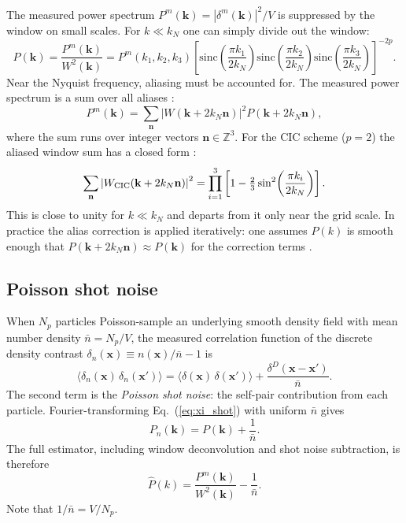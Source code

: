 \documentclass[12pt]{article}
\newcommand{\bx}{\mathbf{x}}
\newcommand{\bk}{\mathbf{k}}
\begin{document}
The measured power spectrum $P^m(\bk) = |\delta^m(\bk)|^2/V$
is suppressed by the window on small scales.  For $k \ll k_N$ one
can simply divide out the window:
%
\begin{equation}
  P(\bk) = \frac{P^m(\bk)}{W^2(\bk)}
    = P^m(k_1,k_2,k_3)\left[
        \mathrm{sinc}\!\left(\frac{\pi k_1}{2k_N}\right)
        \mathrm{sinc}\!\left(\frac{\pi k_2}{2k_N}\right)
        \mathrm{sinc}\!\left(\frac{\pi k_3}{2k_N}\right)
      \right]^{-2p}.
  \label{eq:deconv}
\end{equation}
%
Near the Nyquist frequency, aliasing must be accounted for.
The measured power spectrum is a sum over all aliases
\citep{Jing2005}:
%
\begin{equation}
  P^m(\bk) = \sum_{\mathbf{n}}
    \left|W(\bk + 2k_N\mathbf{n})\right|^2
    P(\bk + 2k_N\mathbf{n}),
  \label{eq:alias}
\end{equation}
%
where the sum runs over integer vectors $\mathbf{n}\in\mathbb{Z}^3$.
For the CIC scheme ($p=2$) the aliased window sum has a closed form
\citep{Jing2005}:
%
\begin{equation}
  \sum_{\mathbf{n}}
    \left|W_{\rm CIC}(\bk + 2k_N\mathbf{n})\right|^2
  = \prod_{i=1}^{3}
    \left[1 - \tfrac{2}{3}\sin^2\!\left(\frac{\pi k_i}{2k_N}\right)\right].
  \label{eq:alias_cic}
\end{equation}
%
This is close to unity for $k \ll k_N$ and departs from it only
near the grid scale.  In practice the alias correction is applied
iteratively: one assumes $P(k)$ is smooth enough that
$P(\bk + 2k_N\mathbf{n}) \approx P(\bk)$ for the correction terms
\citep{Jing2005}.

\subsection{Poisson shot noise}
\label{app:pk_shotnoise}

When $N_p$ particles Poisson-sample an underlying smooth density
field with mean number density $\bar{n} = N_p/V$, the measured
correlation function of the discrete density contrast $\delta_n(\bx)
\equiv n(\bx)/\bar{n} - 1$ is \citep{Peebles1980}
%
\begin{equation}
  \langle\delta_n(\bx)\,\delta_n(\bx')\rangle
    = \langle\delta(\bx)\,\delta(\bx')\rangle
      + \frac{\delta^D(\bx - \bx')}{\bar{n}}.
  \label{eq:xi_shot}
\end{equation}
%
The second term is the \emph{Poisson shot noise}: the self-pair
contribution from each particle.  Fourier-transforming
Eq.~(\ref{eq:xi_shot}) with uniform $\bar{n}$ gives
%
\begin{equation}
  P_n(\bk) = P(\bk) + \frac{1}{\bar{n}}.
  \label{eq:Pk_shot}
\end{equation}
%
The full estimator, including window deconvolution and shot noise
subtraction, is therefore
%
\begin{equation}
  \hat{P}(k) = \frac{P^m(\bk)}{W^2(\bk)} - \frac{1}{\bar{n}}.
  \label{eq:Pk_full}
\end{equation}
%
Note that $1/\bar{n} = V/N_p$.
\end{document}
